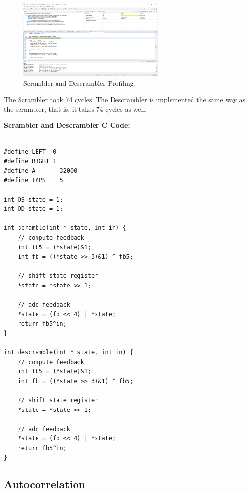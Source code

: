 \documentclass{article}
\begin{document}
\begin{figure}[h]
  \begin{center}
    \includegraphics[width=0.65\textwidth]{img/scrambler_profile.png}
    \caption{Scrambler and Descrambler Profiling.}
  \end{center}
\end{figure}

The Scrambler took 74 cycles.
The Descrambler is implemented the same way as the scrambler, that is,
it takes 74 cycles as well.
\newline

\textbf{Scrambler and Descrambler C Code:}

\begin{verbatim}

#define LEFT  0
#define RIGHT 1
#define A       32000
#define TAPS    5

int DS_state = 1;
int DD_state = 1;

int scramble(int * state, int in) {
    // compute feedback
    int fb5 = (*state)&1;
    int fb = ((*state >> 3)&1) ^ fb5;

    // shift state register
    *state = *state >> 1;

    // add feedback
    *state = (fb << 4) | *state;
    return fb5^in;
}

int descramble(int * state, int in) {
    // compute feedback
    int fb5 = (*state)&1;
    int fb = ((*state >> 3)&1) ^ fb5;

    // shift state register
    *state = *state >> 1;

    // add feedback
    *state = (fb << 4) | *state;
    return fb5^in;
}

\end{verbatim}

\subsection{Autocorrelation}
\end{document}
